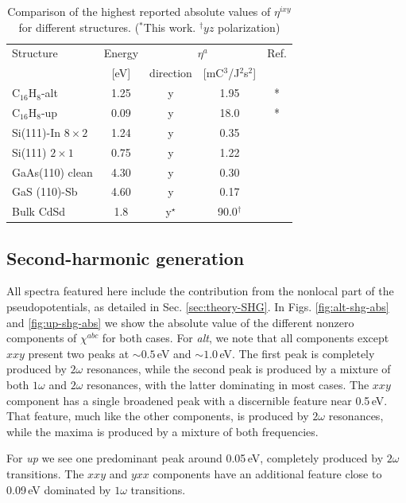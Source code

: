 \documentclass[pss]{wiley2sp} %
\begin{document}
\begin{table}%
  \sidecaption
  \begin{tabular}{lcccc}
  \hline
    Structure & Energy &  \multicolumn{2}{c}{$\eta^{a}$} &  Ref.\\
    \cline{3-4}
              & [eV]   & direction & [mC$^{3}$/J$^{2}$s$^{2}$] \\
    \hline
    C$_{16}$H$_{8}$-alt     & 1.25  & y & 1.95  & *     \\
    C$_{16}$H$_{8}$-up      & 0.09  & y & 18.0  & *     \\
    Si(111)-In $8\times2$   & 1.24  & y & 0.35  & \cite{arzatePRB14}  \\
    Si(111) $2\times1$      & 0.75  & y & 1.22  & \cite{mendozaPRB12} \\
    GaAs(110) clean         & 4.30  & y & 0.30  & \cite{nastosPRB07}     \\
    GaS (110)-Sb            & 4.60  & y & 0.17  & \cite{cabellosPRB11}\\
    Bulk CdSd               & 1.8   & y$^{\star}$ & 90.0$^{\dag}$  & \cite{lamanAPL99}  \\
  \hline
  \end{tabular}
  \caption[]{%
  Comparison of the highest reported absolute values of {$\eta^{ixy}$} for 
    different structures. ($^{*}$This work. $^{\dag}yz$ polarization)}
  \label{tab:etacomp}
\end{table}

\subsection{Second-harmonic generation}
All spectra featured here include the contribution from the nonlocal part of
the pseudopotentials, as detailed in Sec. \ref{sec:theory-SHG}. In Figs.
\ref{fig:alt-shg-abs} and \ref{fig:up-shg-abs} we show the absolute value of the different nonzero
components of $\chi^{abc}$ for both cases. For \emph{alt}, we note that all
components except $xxy$ present two peaks at $\sim0.5$\,eV and $\sim1.0$\,eV.
The first peak is completely produced by $2\omega$ resonances, while the
second peak is produced by a mixture of both $1\omega$ and $2\omega$
resonances, with the latter dominating in most cases. The $xxy$ component has
a single broadened peak with a discernible feature near 0.5\,eV. That feature,
much like the other components, is produced by $2\omega$ resonances, while the
maxima is produced by a mixture of both frequencies.

For \emph{up} we see one predominant peak around 0.05\,eV, completely produced
by $2\omega$ transitions. The $xxy$ and $yxx$ components have an additional
feature close to 0.09\,eV dominated by $1\omega$ transitions.
\end{document}
